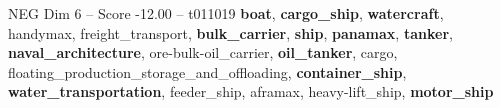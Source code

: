 \begin{textsample}{NEG Dim 6 – Score -12.00 – t011019}  \label{ex:f6_neg_010}
\textbf{boat}, \textbf{cargo\_ship}, \textbf{watercraft}, handymax, freight\_transport, \textbf{bulk\_carrier}, \textbf{ship}, \textbf{panamax}, \textbf{tanker}, \textbf{naval\_architecture}, ore-bulk-oil\_carrier, \textbf{oil\_tanker}, cargo, floating\_production\_storage\_and\_offloading, \textbf{container\_ship}, \textbf{water\_transportation}, feeder\_ship, aframax, heavy-lift\_ship, \textbf{motor\_ship}

\end{textsample}
